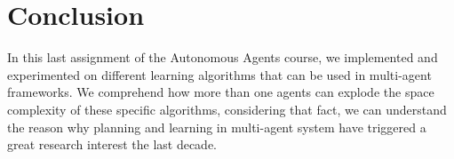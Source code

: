 \documentclass[a4paper,11pt]{article}
\begin{document}
\newpage

\section{Conclusion}
In this last assignment of the Autonomous Agents course, we implemented and experimented on different learning algorithms that can be used in multi-agent frameworks. We comprehend how more than one agents can explode the space complexity of these specific algorithms, considering that fact, we can understand the reason why planning and learning in multi-agent system have triggered a great research interest the last decade.
\end{document}
